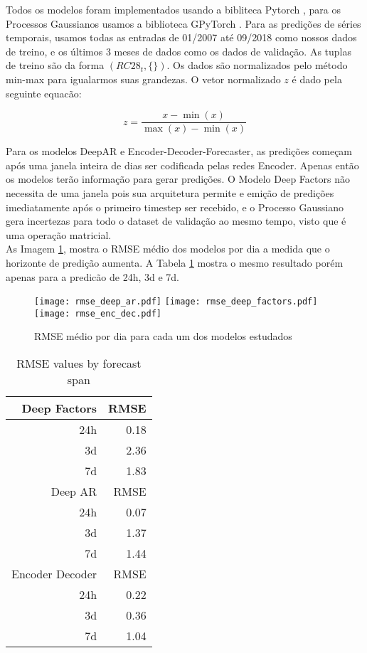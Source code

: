 Todos os modelos foram implementados usando a bibliteca Pytorch \cite{pytorch}, para os Processos Gaussianos usamos a biblioteca GPyTorch \cite{gpytorch}. Para as predições de séries temporais, usamos todas as entradas de 01/2007 até 09/2018 como nossos dados de treino, e os últimos 3 meses de dados como os dados de validação. As tuplas de treino são da forma $(RC28_{t},\{\})$. Os dados são normalizados pelo método min-max para igualarmos suas grandezas. O vetor normalizado $z$ é dado pela seguinte equacão:  


\begin{equation}
z=\frac{x-\min (x)}{\max (x)-\min (x)}
\end{equation}


Para os modelos DeepAR e Encoder-Decoder-Forecaster, as predições começam após uma janela inteira de dias ser codificada pelas redes Encoder. Apenas então os modelos terão informação para gerar predições. O Modelo Deep Factors não necessita de uma janela pois sua arquitetura permite e emição de predições imediatamente após o primeiro timestep ser recebido, e o Processo Gaussiano gera incertezas para todo o dataset de validação ao mesmo tempo, visto que é uma operação matricial. \\

As Imagem \ref{fig:rmseday}, mostra o RMSE médio dos modelos por dia a medida que o horizonte de predição aumenta. A Tabela \ref{tab:rmse} mostra o mesmo resultado porém apenas para a predicão de 24h, 3d e 7d. \\



\begin{figure}[H]
\label{fig:rmseday}
\centering
\texttt{[image: rmse\_deep\_ar.pdf]} \hfill
\texttt{[image: rmse\_deep\_factors.pdf]} \hfill
\texttt{[image: rmse\_enc\_dec.pdf]} 
\caption{RMSE médio por dia para cada um dos modelos estudados} 
\end{figure}


\begin{center}
\begin{table}[htbp]
\caption{\label{tab:rmse}
RMSE values by forecast span}
\centering
\begin{tabular}{rr}
\hline
Deep Factors & RMSE\\
\hline
24h & 0.18\\
3d & 2.36\\
7d & 1.83\\
\hline
Deep AR & RMSE\\
\hline
24h & 0.07\\
3d & 1.37\\
7d & 1.44\\
\hline
Encoder Decoder & RMSE\\
\hline
24h & 0.22\\
3d & 0.36\\
7d & 1.04\\
\end{tabular}
\end{table}
\end{center}


